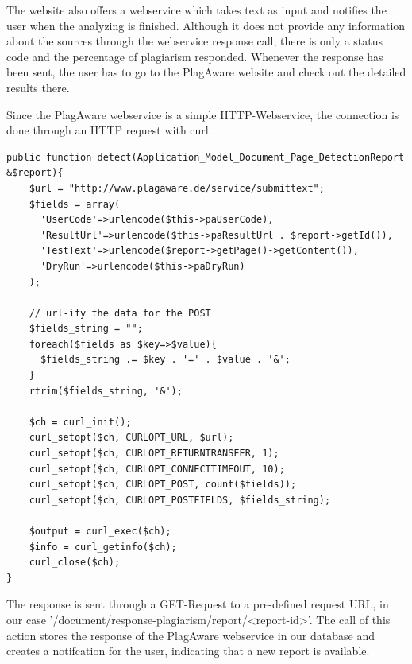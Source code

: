 The website also offers a webservice which takes text as input and notifies the user when the analyzing is finished. Although it does not provide any information about the sources through the webservice response call, there is only a status code and the percentage of plagiarism responded. Whenever the response has been sent, the user has to go to the PlagAware website and check out the detailed results there.

Since the PlagAware webservice is a simple HTTP-Webservice, the connection is done through an HTTP request with curl.
\begin{lstlisting}[caption=Sending a request through curl to the PlagAware webservice]
public function detect(Application_Model_Document_Page_DetectionReport &$report){
    $url = "http://www.plagaware.de/service/submittext";
    $fields = array(
      'UserCode'=>urlencode($this->paUserCode),
      'ResultUrl'=>urlencode($this->paResultUrl . $report->getId()),
      'TestText'=>urlencode($report->getPage()->getContent()),
      'DryRun'=>urlencode($this->paDryRun)
    );

    // url-ify the data for the POST
    $fields_string = "";
    foreach($fields as $key=>$value){
      $fields_string .= $key . '=' . $value . '&';
    }
    rtrim($fields_string, '&');

    $ch = curl_init();
    curl_setopt($ch, CURLOPT_URL, $url);
    curl_setopt($ch, CURLOPT_RETURNTRANSFER, 1);
    curl_setopt($ch, CURLOPT_CONNECTTIMEOUT, 10);
    curl_setopt($ch, CURLOPT_POST, count($fields));
    curl_setopt($ch, CURLOPT_POSTFIELDS, $fields_string);

    $output = curl_exec($ch);
    $info = curl_getinfo($ch);
    curl_close($ch);
}
\end{lstlisting}

The response is sent through a GET-Request to a pre-defined request URL, in our case '/document/response-plagiarism/report/<report-id>'. The call of this action stores the response of the PlagAware webservice in our database and creates a notifcation for the user, indicating that a new report is available.